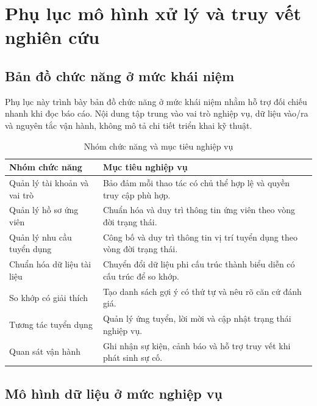 \chapter{Phụ lục mô hình xử lý và truy vết nghiên cứu}

\section{Bản đồ chức năng ở mức khái niệm}

Phụ lục này trình bày bản đồ chức năng ở mức khái niệm nhằm hỗ trợ đối chiếu nhanh khi đọc báo cáo. Nội dung tập trung vào vai trò nghiệp vụ, dữ liệu vào/ra và nguyên tắc vận hành, không mô tả chi tiết triển khai kỹ thuật.

\begin{table}[H]
\caption{Nhóm chức năng và mục tiêu nghiệp vụ}
\centering
\begin{tabularx}{\textwidth}{p{}X}
\toprule
\textbf{Nhóm chức năng} & \textbf{Mục tiêu nghiệp vụ}\\
\midrule
Quản lý tài khoản và vai trò & Bảo đảm mỗi thao tác có chủ thể hợp lệ và quyền truy cập phù hợp.\\
Quản lý hồ sơ ứng viên & Chuẩn hóa và duy trì thông tin ứng viên theo vòng đời trạng thái.\\
Quản lý nhu cầu tuyển dụng & Công bố và duy trì thông tin vị trí tuyển dụng theo vòng đời trạng thái.\\
Chuẩn hóa dữ liệu tài liệu & Chuyển đổi dữ liệu phi cấu trúc thành biểu diễn có cấu trúc để so khớp.\\
So khớp có giải thích & Tạo danh sách gợi ý có thứ tự và nêu rõ căn cứ đánh giá.\\
Tương tác tuyển dụng & Quản lý ứng tuyển, lời mời và cập nhật trạng thái nghiệp vụ.\\
Quan sát vận hành & Ghi nhận sự kiện, cảnh báo và hỗ trợ truy vết khi phát sinh sự cố.\\
\bottomrule
\end{tabularx}
\end{table}

\section{Mô hình dữ liệu ở mức nghiệp vụ}

